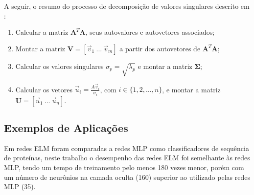 A seguir, o resumo do processo de decomposição de valores singulares descrito em :
\begin{enumerate}
	\item Calcular a matriz $\mathbf{A}^T\mathbf{A}$, seus autovalores e autovetores associados;
	\item Montar a matriz $\mathbf{V}=[\vec{v}_1 \ \dots \ \vec{v}_m]$ a partir dos autovetores de $\mathbf{A}^T\mathbf{A}$;
	\item Calcular os valores singulares $\sigma_p = \sqrt{\lambda_p}$ e montar a matriz $\mathbf{\Sigma}$;
	\item Calcular os vetores $\vec{u}_i=\frac{A\vec{v}_i}{\sigma_i}$, com $i \in \{1,2, \ldots, n\}$, e montar a matriz $\mathbf{U}=[\vec{u}_1 \ \ldots \ \vec{u}_n]$.
\end{enumerate}


\subsection{Exemplos de Aplicações}

Em  redes ELM foram comparadas a redes MLP como classificadores de sequência de proteínas, neste trabalho o desempenho das redes ELM foi semelhante às redes MLP, tendo um tempo de treinamento pelo menos 180 vezes menor, porém com um número de neurônios na camada oculta (160) superior ao utilizado pelas redes MLP (35).


